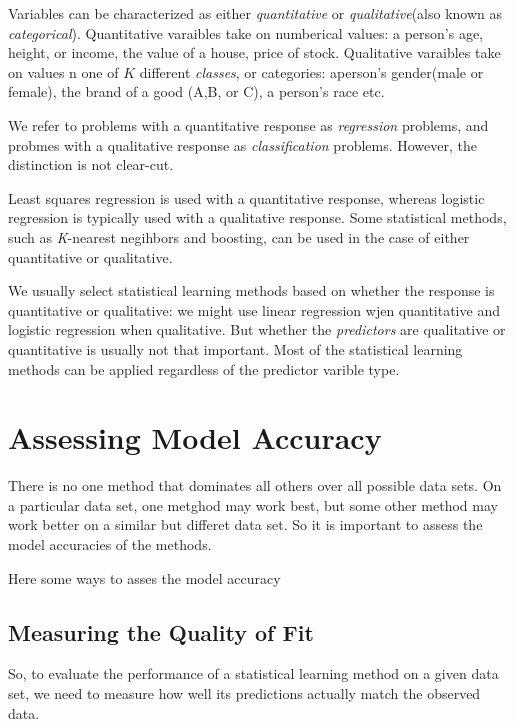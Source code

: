 \documentclass[
  letterpaper,
  DIV=11,
  numbers=noendperiod]{scrreprt}
\begin{document}
Variables can be characterized as either \emph{quantitative} or
\emph{qualitative}(also known as \emph{categorical}). Quantitative
varaibles take on numberical values: a person's age, height, or income,
the value of a house, price of stock. Qualitative varaibles take on
values n one of \(K\) different \emph{classes}, or categories: aperson's
gender(male or female), the brand of a good (A,B, or C), a person's race
etc.

We refer to problems with a quantitative response as \emph{regression}
problems, and probmes with a qualitative response as
\emph{classification} problems. However, the distinction is not
clear-cut.

Least squares regression is used with a quantitative response, whereas
logistic regression is typically used with a qualitative response. Some
statistical methods, such as \emph{K}-nearest negihbors and boosting,
can be used in the case of either quantitative or qualitative.

We usually select statistical learning methods based on whether the
response is quantitative or qualitative: we might use linear regression
wjen quantitative and logistic regression when qualitative. But whether
the \emph{predictors} are qualitative or quantitative is usually not
that important. Most of the statistical learning methods can be applied
regardless of the predictor varible type.

\hypertarget{assessing-model-accuracy}{%
\section{Assessing Model Accuracy}\label{assessing-model-accuracy}}

There is no one method that dominates all others over all possible data
sets. On a particular data set, one metghod may work best, but some
other method may work better on a similar but differet data set. So it
is important to assess the model accuracies of the methods.

Here some ways to asses the model accuracy

\hypertarget{measuring-the-quality-of-fit}{%
\subsection{Measuring the Quality of
Fit}\label{measuring-the-quality-of-fit}}

So, to evaluate the performance of a statistical learning method on a
given data set, we need to measure how well its predictions actually
match the observed data.
\end{document}
